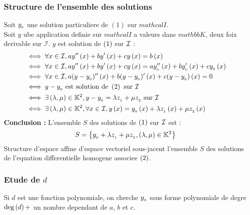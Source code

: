 \documentclass[12pt,twoside,a4paper]{article}
\begin{document}
			\subsubsection{Structure de l'ensemble des solutions}
				Soit $y_{_{0}}$ une solution particuliere de $\left(1\right)$ sur $mathcal{I}$.\\
				Soit $y$ ube application definie sur $mathcal{I}$ a valeurs dans $mathbb{K}$, deux foix derivable sur $\mathcal{I}$.
				$y$ est solution de $\left(1\right)$ sur $\mathcal{I}$ :
				$$\begin{aligned}
					&\iff\forall x\in\mathcal{I},ay''\left(x\right)+by'\left(x\right)+cy\left(x\right)=b\left(x\right) \\
					&\iff\forall x\in\mathcal{I},ay''\left(x\right)+by'\left(x\right)+cy\left(x\right)=ay''_{_{0}}\left(x\right)+by'_{_{0}}\left(x\right)+cy_{_{0}}\left(x\right) \\
					&\iff\forall x\in\mathcal{I},a(y-y_{_{0}})''\left(x\right)+b(y-y_{_{0}})'\left(x\right)+c(y-y_{_{0}})\left(x\right)=0 \\
					&\iff y-y_{_{0}}\text{ est solution de }\left(2\right)\text{ sur }\mathcal{I} \\
					&\iff\exists\left(\lambda,\mu\right)\in\mathbb{K}^2,y-y_{_{0}}=\lambda z_{_{1}}+\mu z_{_{2}}\text{ sur }\mathcal{I} \\
					&\iff\exists\left(\lambda,\mu\right)\in\mathbb{K}^2,\forall x\in\mathcal{I},y\left(x\right)=y_{_{0}}\left(x\right)+\lambda z_{_{1}}\left(x\right)+\mu z_{_{2}}\left(x\right)
				\end{aligned}$$
				\textbf{Conclusion :} L'ensemble $S$ des solutions de $\left(1\right)$ sur $\mathcal{I}$ est :
				$$S=\left\{y_{_{0}}+\lambda z_{_{1}}+\mu z_{_{2}},\left(\lambda,\mu\right)\in\mathbb{K}^2\right\}$$
				Structure d'espace affine d'espace vectoriel sous-jacent l'ensemble $S$ des solutions de l'equation differentielle homogene associee $\left(2\right)$.
			\subsubsection{Etude de $d$}
				\begin{liste}
					\item Si $d$ est une fonction polynomiale, on cherche $y_{_{0}}$ sous forme polynomiale de degre $\deg\left(d\right)+$ un nombre dependant de $a$, $b$ et $c$.
				\end{liste}
\end{document}
